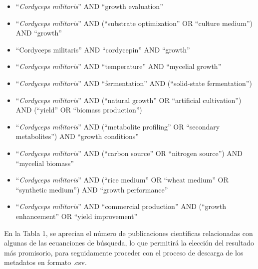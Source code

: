 \documentclass[
  spanish,
  letterpaper,
  DIV=11,
  numbers=noendperiod]{scrreprt}
\begin{document}
\begin{itemize}
\item
  ``\emph{Cordyceps militaris}'' AND ``growth evaluation''
\item
  ``\emph{Cordyceps militaris}'' AND (``substrate optimization'' OR
  ``culture medium'') AND ``growth''
\item
  ``Cordyceps militaris'' AND ``cordycepin'' AND ``growth''
\item
  ``\emph{Cordyceps militaris}'' AND ``temperature'' AND ``mycelial
  growth''
\item
  ``\emph{Cordyceps militaris}'' AND ``fermentation'' AND (``solid-state
  fermentation'')
\item
  ``\emph{Cordyceps militaris}'' AND (``natural growth'' OR ``artificial
  cultivation'') AND (``yield'' OR ``biomass production'')
\item
  ``\emph{Cordyceps militaris}'' AND (``metabolite profiling'' OR
  ``secondary metabolites'') AND ``growth conditions''
\item
  ``\emph{Cordyceps militaris}'' AND (``carbon source'' OR ``nitrogen
  source'') AND ``mycelial biomass''
\item
  ``\emph{Cordyceps militaris}'' AND (``rice medium'' OR ``wheat
  medium'' OR ``synthetic medium'') AND ``growth performance''
\item
  ``\emph{Cordyceps militaris}'' AND ``commercial production'' AND
  (``growth enhancement'' OR ``yield improvement''
\end{itemize}

En la Tabla 1, se aprecian el número de publicaciones científicas
relacionadas con algunas de las ecuanciones de búsqueda, lo que
permitirá la elección del resultado más promisorio, para seguidamente
proceder con el proceso de descarga de los metadatos en formato .csv.
\end{document}
